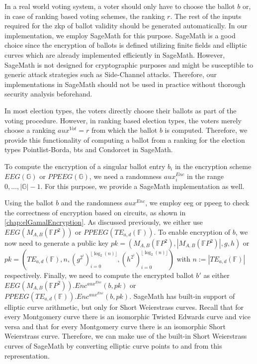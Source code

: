 In a real world voting system, a voter should only have to choose the ballot $b$ or, in case of ranking based voting schemes, the ranking $r$.
The rest of the inputs required for the \gls{zkp} of ballot validity should be generated automatically.
In our implementation, we employ SageMath \cite{matthias_koppe_sagemath_2025} for this purpose.
SageMath is a good choice since the encryption of ballots is defined utilizing finite fields and elliptic curves which are already implemented efficiently in SageMath.
However, SageMath is not designed for cryptographic purposes and might be susceptible to generic attack strategies such as Side-Channel attacks.
Therefore, our implementations in SageMath should not be used in practice without thorough security analysis beforehand.

In most election types, the voters directly choose their ballots as part of the voting procedure.
However, in ranking based election types, the voters merely choose a ranking $aux^{Vot}=r$ from which the ballot $b$ is computed.
Therefore, we provide this functionality of computing a ballot from a ranking for the election types Pointlist-Borda, \gls{bts} and Condorcet in SageMath.

To compute the encryption of a singular ballot entry $b_i$ in the encryption scheme $EEG(\mathbb{G})$ or $PPEEG(\mathbb{G})$, we need a randomness $aux^{Enc}_i$ in the range $0,\dots, |\mathbb{G}|-1$.
For this purpose, we provide a SageMath implementation as well.

Using the ballot $b$ and the randomness $aux^{Enc}$, we employ \gls{eeg} or \gls{ppeeg} to check the correctness of encryption based on circuits, as shown in \cref{chap:elGamalEncryption}.
As discussed previously, we either use $EEG(M_{A,B}(\mathbb{F}P^2))$ or $PPEEG(TE_{a,d}(\mathbb{F}))$.
To enable encryption of $b$, we now need to generate a public key $pk=(M_{A,B}(\mathbb{F}P^2), |M_{A,B}(\mathbb{F}P^2)|, g, h)$ or $pk=\left(TE_{a,d}(\mathbb{F}), n, \left(g^{2^i}\right)_{i=0}^{\lfloor \log_2(n)\rfloor}, \left(h^{2^i}\right)_{i=0}^{\lfloor \log_2(n)\rfloor}\right)$ with $n:=|TE_{a,d}(\mathbb{F})|$ respectively.
Finally, we need to compute the encrypted ballot $b'$ as either $EEG(M_{A,B}(\mathbb{F}P^2)).Enc^{aux^{Enc}}(b, pk)$ or $PPEEG(TE_{a,d}(\mathbb{F})).Enc^{aux^{Enc}}(b, pk)$.
SageMath has built-in support of elliptic curve arithmetic, but only for Short Weierstrass curves.
Recall that for every Montgomery curve there is an isomorphic Twisted Edwards curve and vice versa and that for every Montgomery curve there is an isomorphic Short Weierstrass curve.
Therefore, we can make use of the built-in Short Weierstrass curves of SageMath by converting elliptic curve points to and from this representation.

